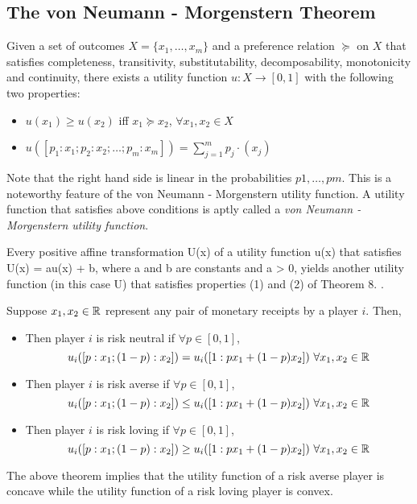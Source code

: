 \subsection{The von Neumann - Morgenstern Theorem}
\begin{theorem}
	Given a set of outcomes $X = \{x_1,\ldots, x_m\}$ and a preference relation $\succeq$ on $X$ that satisfies completeness, transitivity, substitutability, decomposability, monotonicity and continuity, there exists a utility function $u : X \rightarrow [0, 1]$ with the following two properties:
	\begin{itemize}
		\item $u(x_1)\geq u(x_2)$ iff $x_1\succeq x_2$, $\forall x_1,x_2\in X$
		\item $u([p_1:x_1;p_2:x_2;\ldots;p_m:x_m])=\sum_{j=1}^m p_j\cdot(x_j)$
	\end{itemize}
\end{theorem}
\begin{note}
	Note that the right hand side is linear in the probabilities $p1,\ldots, pm$.
	This is a noteworthy feature of the von Neumann - Morgenstern utility function.
	A utility function that satisfies above conditions is aptly called a \emph{von Neumann - Morgenstern utility function}.
\end{note}
\begin{prop}
	Every positive affine transformation U(x) of a utility function u(x) that satisfies U(x) = au(x) + b, where a and b are constants and a > 0, yields another utility function (in this case U) that satisfies properties (1) and (2) of Theorem 8.
	.
\end{prop}
\begin{theorem}
	Suppose $x_1, x_2 \in \mathbb{R}$ represent any pair of monetary receipts by a player $i$.
	Then,
	\begin{itemize}
		\item Then player $i$ is risk neutral if $\forall p \in [0, 1]$,
		\[u_i([p:x_1;(1-p):x_2])=u_i([1:px_1+(1-p)x_2])\ \forall x_1,x_2\in \R\]
		\item Then player $i$ is risk averse if $\forall p \in [0, 1]$,
		\[u_i([p:x_1;(1-p):x_2])\leq u_i([1:px_1+(1-p)x_2])\ \forall x_1,x_2\in \mathbb{R}\]
		\item Then player $i$ is risk loving if $\forall p \in [0, 1]$,
		\[u_i([p:x_1;(1-p):x_2])\geq u_i([1:px_1+(1-p)x_2])\ \forall x_1,x_2\in \mathbb{R}\]
	\end{itemize}
\end{theorem}
\begin{note}
	The above theorem implies that the utility function of a risk averse player is concave while the utility function of a risk loving player is convex.
\end{note}